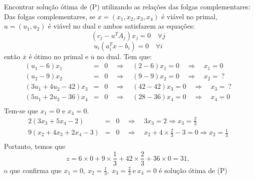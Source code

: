 \documentclass[12pt]{exam}
\begin{document}
\begin{questions}
\begin{solution}
	Encontrar solução ótima de (P) utilizando as relações das folgas complementares: \\ 
Das folgas complementares, se $x = (x_1, x_2,x_3,x_4)$ é viável no primal, $u = (u_1, u_2)$ é viável no dual e ambos satisfazem as equações:
	$$(c_j - u^TA_j) x_j = 0 \quad \forall j $$
	$$ u_i(a_{i}^Tx - b_i) = 0 \quad \forall i $$
	então $\overline{x}$ é ótimo no primal e $\overline{u}$ no dual. Tem que: 
	\begin{equation*}	
	\begin{array}{rcl}
	(u_1 - 6)x_1 & = & 0   \quad \Rightarrow  \quad  (2 - 6)x_1 = 0  \quad \Rightarrow  \quad  x_1 = 0\\
	(u_2 - 9)x_2 & = & 0  \quad \Rightarrow  \quad (9 - 9)x_2 = 0  \quad \Rightarrow  \quad x_2 =~?\\
	(3u_1 + 4u_2 - 42)x_3 & = & 0 \quad \Rightarrow  \quad (42 - 42)x_3 = 0 \quad \Rightarrow  \quad  x_3 =~?\\
	(5u_1 + 2u_2 - 36)x_4 & = & 0   \quad \Rightarrow  \quad   (28 - 36)x_4 = 0 \quad \Rightarrow  \quad x_4 = 0 \\
	\end{array}
	\end{equation*}	
Tem-se que $x_1 = 0$ e $x_4 = 0$.
	\begin{equation*}	
	\begin{array}{rcl}
	 2(3x_3 + 5x_4 - 2) & = & 0  \quad \Rightarrow  \quad 3x_3 = 2  \Rightarrow x_3  = \frac{2}{3} \\
	9(x_2 + 4x_3 + 2x_4 - 3) & = & 0   \quad \Rightarrow  \quad x_2 + 4\times\frac{2}{3} - 3= 0  \Rightarrow  x_2 = \frac{1}{3} \\
	\end{array}
	\end{equation*}	
	Portanto, temos que
	$$z = 6\times 0 + 9 \times \frac{1}{3} + 42 \times \frac{2}{3} + 36 \times 0 = 31,$$
	o que confirma que $x_1 =0,~x_2=\frac{1}{3},~x_3=\frac{2}{3}~\text{e}~x_4=0$ é solução ótima de (P)
	\end{solution}
	

		


\end{questions}
\end{document}
